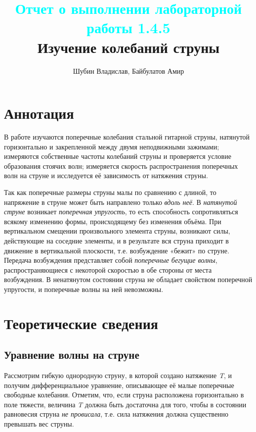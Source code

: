 \documentclass[
a4paper, %
12pt, %
]{article}
\title{
	\textcolor{cyan}{Отчет о выполнении лабораторной работы 1.4.5}
	\\
	Изучение колебаний струны
}
\author{Шубин Владислав, Байбулатов Амир}
\begin{document}
    
	
	\maketitle
	
	\section{Аннотация}
	
	В работе изучаются поперечные колебания стальной гитарной струны, натянутой горизонтально и закрепленной между двумя неподвижными зажимами; измеряются собственные частоты колебаний струны и проверяется условие образования стоячих волн; измеряется скорость распространения поперечных волн на струне и исследуется её зависимость от натяжения струны.
	
	Так как поперечные размеры струны малы по сравнению с длиной, то напряжение в струне может быть направлено только \textit{вдоль неё}. В \textit{натянутой струне} возникает \textit{поперечная упругость}, то есть способность сопротивляться всякому изменению формы, происходящему без изменения объёма. При вертикальном смещении произвольного элемента струны, возникают силы, действующие на соседние элементы, и в результате вся струна приходит в движение в вертикальной плоскости, т.е. возбуждение «бежит» по струне. Передача возбуждения представляет собой \textit{поперечные бегущие волны}, распространяющиеся с некоторой скоростью в обе стороны от места возбуждения. В ненатянутом состоянии струна не обладает свойством поперечной упругости, и поперечные волны на ней невозможны.
	
	\newpage
	
	\section{Теоретические сведения}
	
	\subsection{Уравнение волны на струне}
	Рассмотрим гибкую однородную струну, в которой создано натяжение \textit{T}, и получим дифференциальное уравнение, описывающее её малые поперечные свободные колебания. Отметим, что, если струна расположена горизонтально в поле тяжести, величина \textit{T} должна быть достаточна для того, чтобы в состоянии равновесия струна \textit{не провисала}, т.е. сила натяжения должна существенно превышать вес струны.
	
\end{document}
